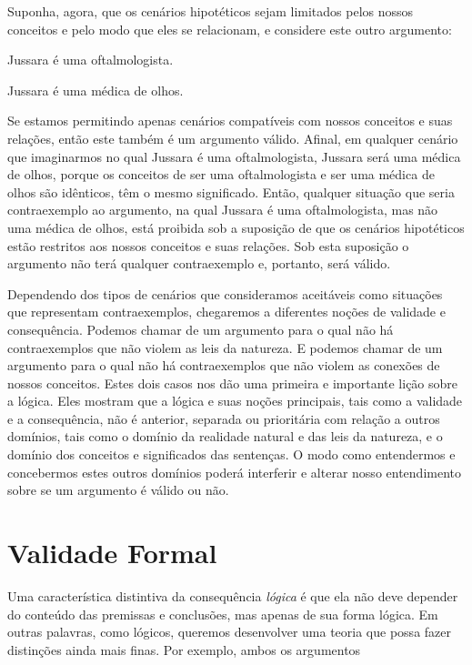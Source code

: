 Suponha, agora, que os cenários hipotéticos sejam limitados pelos nossos conceitos e pelo modo que eles se relacionam, e considere este outro argumento:
	\begin{earg}
		\item[] Jussara é uma oftalmologista.
		\item[\therefore] Jussara é uma médica de olhos.
	\end{earg}
Se estamos permitindo apenas cenários compatíveis com nossos conceitos e suas relações, então este também é um argumento válido.
Afinal, em qualquer cenário que imaginarmos no qual Jussara é uma oftalmologista, Jussara será uma médica de olhos, porque os conceitos de ser uma oftalmologista e ser uma médica de olhos são idênticos, têm o mesmo significado.
Então, qualquer situação que seria contraexemplo ao argumento, na qual Jussara é uma oftalmologista, mas não uma médica de olhos, está proibida sob a suposição de que os cenários hipotéticos estão restritos aos nossos conceitos e suas relações.
Sob esta suposição o argumento não terá qualquer contraexemplo e, portanto, será válido.

Dependendo dos tipos de cenários que consideramos aceitáveis como situações que representam contraexemplos, chegaremos a diferentes noções de validade e consequência.
Podemos chamar de  um argumento para o qual não há contraexemplos que não violem as leis da natureza.
E podemos chamar de  um argumento para o qual não há contraexemplos que não violem as conexões de nossos conceitos.
Estes dois casos nos dão uma primeira e importante lição sobre a lógica.
Eles mostram que a lógica e suas noções principais, tais como a validade e a consequência, não é anterior, separada ou prioritária com relação a outros domínios, tais como o domínio da realidade natural e das leis da natureza, e o domínio dos conceitos e significados das sentenças.
O modo como entendermos e concebermos estes outros domínios poderá interferir e alterar nosso entendimento sobre se um argumento é válido ou não.


\section{Validade Formal}

Uma característica distintiva da consequência \emph{lógica} é que ela não deve depender do conteúdo das premissas e conclusões, mas apenas de sua forma lógica.
Em outras palavras, como lógicos, queremos desenvolver uma teoria que possa fazer distinções ainda mais finas. Por exemplo, ambos os argumentos

